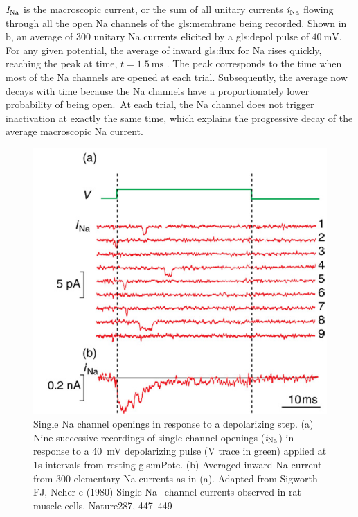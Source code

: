 \documentclass[class={myRUCProject}, crop=false]{standalone}
\begin{document}
{}\(\mathit{I}_\mathrm{Na}\) is the macroscopic current, or the sum of all unitary currents \(\mathit{i}_\mathrm{Na}\) flowing through all the open \gls{Na} channels of the \gls{gls:membrane} being recorded. Shown in b, an average of \(\num{300}\) unitary \gls{Na} currents elicited by a \gls{gls:depol} pulse of \(\qty{40}{\mV}\). 
For any given potential, the average of inward \gls{gls:flux} for \gls{Na} rises quickly, reaching the peak at time, \(t=\qty{1.5}{\ms}\) \cite{Hammond2015ch4}. 
The peak corresponds to the time when most of the \gls{Na} channels are opened at each trial. 
Subsequently, the average now decays with time because the \gls{Na} channels have a proportionately lower probability of being open.\footnotemark~At each trial, the \gls{Na} channel does not trigger inactivation at exactly the same time, which explains the progressive decay of the average macroscopic \gls{Na} current. 


\begin{figure}[H]
  \centering
  \includegraphics[width=0.5\linewidth]{Pictures//Anakin/iNa.png}
  \caption{Single \gls{Na} channel openings in response to a depolarizing step. (a) Nine successive recordings of single channel openings (\(\mathit{i}_\mathrm{Na}\)) in response to a \qty{ 40}{\mV} depolarizing pulse (V trace in green) applied at 1s intervals from resting \gls{gls:mPote}. (b) Averaged inward \gls{Na} current from 300 elementary \gls{Na} currents as in (a). Adapted from Sigworth FJ, Neher e (1980) Single Na+channel currents observed in rat muscle cells. Nature287, 447–449 }
  \label{fig:unitcurNa}
\end{figure}
\end{document}
